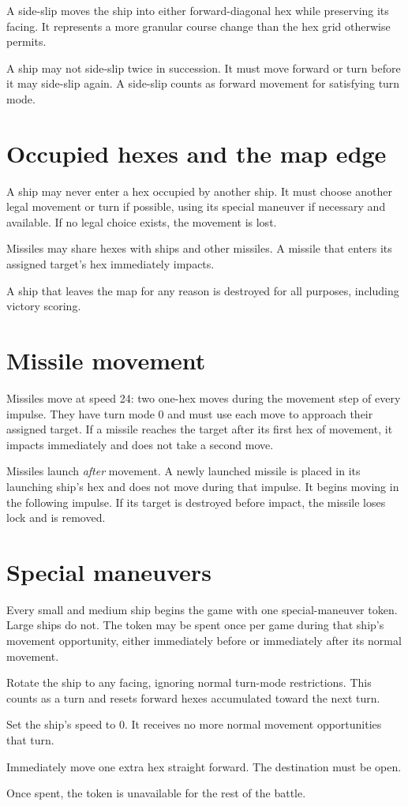 A side-slip moves the ship into either forward-diagonal hex while preserving its facing. It represents a more granular course change than the hex grid otherwise permits.

A ship may not side-slip twice in succession. It must move forward or turn before it may side-slip again. A side-slip counts as forward movement for satisfying turn mode.

\section{Occupied hexes and the map edge}

A ship may never enter a hex occupied by another ship. It must choose another legal movement or turn if possible, using its special maneuver if necessary and available. If no legal choice exists, the movement is lost.

Missiles may share hexes with ships and other missiles. A missile that enters its assigned target's hex immediately impacts.

A ship that leaves the map for any reason is destroyed for all purposes, including victory scoring.

\section{Missile movement}

Missiles move at speed 24: two one-hex moves during the movement step of every impulse. They have turn mode 0 and must use each move to approach their assigned target. If a missile reaches the target after its first hex of movement, it impacts immediately and does not take a second move.

Missiles launch \emph{after} movement. A newly launched missile is placed in its launching ship's hex and does not move during that impulse. It begins moving in the following impulse. If its target is destroyed before impact, the missile loses lock and is removed.

\section{Special maneuvers}

Every small and medium ship begins the game with one special-maneuver token. Large ships do not. The token may be spent once per game during that ship's movement opportunity, either immediately before or immediately after its normal movement.

\begin{description}[style=nextline,leftmargin=0pt]
  \item[Bootlegger] Rotate the ship to any facing, ignoring normal turn-mode restrictions. This counts as a turn and resets forward hexes accumulated toward the next turn.
  \item[Quick Stop] Set the ship's speed to 0. It receives no more normal movement opportunities that turn.
  \item[Emergency Power] Immediately move one extra hex straight forward. The destination must be open.
\end{description}

Once spent, the token is unavailable for the rest of the battle.
